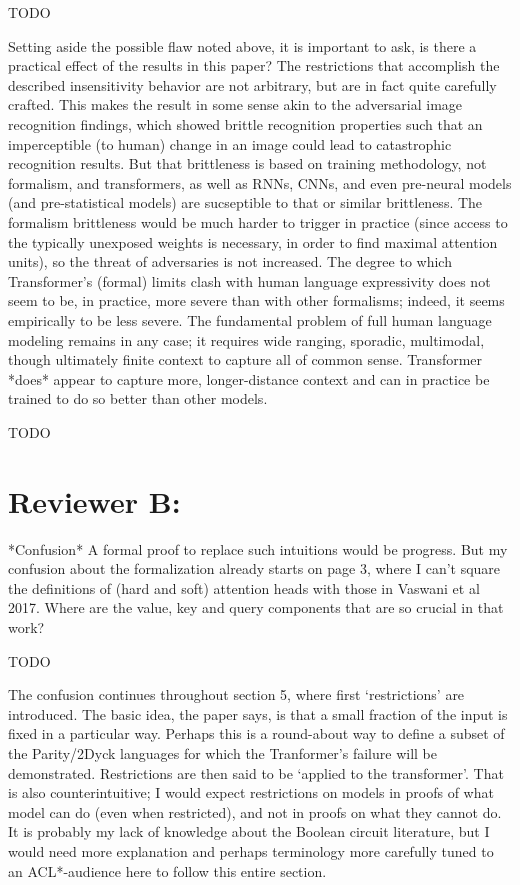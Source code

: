 \documentclass[11pt,a4paper]{article}
\newcommand\response[1]{{\color{blue}#1}}
\begin{document}
\response{TODO}


Setting aside the possible flaw noted above, it is important to ask, is
there a practical effect of the results in this paper? The
restrictions that accomplish the described insensitivity behavior are
not arbitrary, but are in fact quite carefully crafted. This makes the
result in some sense akin to the adversarial image recognition
findings, which showed brittle recognition properties such that an
imperceptible (to human) change in an image could lead to
catastrophic recognition results. But that brittleness is based on
training methodology, not formalism, and transformers, as well as
RNNs, CNNs, and even pre-neural models (and pre-statistical models)
are sucseptible to that or similar brittleness. The formalism
brittleness would be much harder to trigger in practice (since access
to the typically unexposed weights is necessary, in order to find
maximal attention units), so the threat
of adversaries is not increased. The degree to which Transformer's
(formal) limits clash with human language expressivity does not seem
to be, in practice, more severe than with other formalisms; indeed, it
seems empirically to be less severe. The fundamental problem of full
human language modeling remains in any case; it requires wide ranging,
sporadic, multimodal, though ultimately finite context to capture all
of common sense. Transformer *does* appear to capture more,
longer-distance context and can in practice be trained to do so better
than other models.

\response{TODO}

\section{Reviewer B:}


*Confusion*
A formal proof to replace such intuitions would be progress. But my
confusion about the formalization already starts on page 3, where I can’t
square the definitions of (hard and soft) attention heads with those in
Vaswani et al 2017. Where are the value, key and query components that are
so crucial in that work?

\response{TODO}

The confusion continues throughout section 5, where first ‘restrictions’
are introduced. The basic idea, the paper says, is that a small fraction of
the input is fixed in a particular way. Perhaps this is a round-about way to
define a subset of the Parity/2Dyck languages for which the Tranformer’s
failure will be demonstrated. Restrictions are then said to be ‘applied to
the transformer’. That is also counterintuitive; I would expect
restrictions on models in proofs of what model can do (even when
restricted), and not in proofs on what they cannot do. It is probably my
lack of knowledge about the Boolean circuit literature, but I would need
more explanation and perhaps terminology more carefully tuned to an
ACL*-audience here to follow this entire section.
\end{document}
